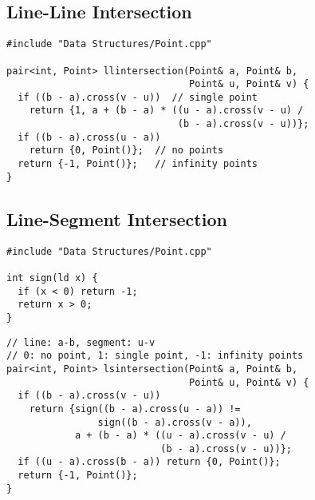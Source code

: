 \documentclass[twoside]{article}
\newcommand{\fileTitleStyle}{\large\underline}
\begin{document}
\begin{multicols*}{2}
\subsectionfont{\centering\bfseries\LARGE}
\subsectionfont{\fileTitleStyle}
\subsection*{Line-Line Intersection}
\begin{verbatim}
#include "Data Structures/Point.cpp"

pair<int, Point> llintersection(Point& a, Point& b,
                                Point& u, Point& v) {
  if ((b - a).cross(v - u))  // single point
    return {1, a + (b - a) * ((u - a).cross(v - u) /
                              (b - a).cross(v - u))};
  if ((b - a).cross(u - a))
    return {0, Point()};  // no points
  return {-1, Point()};   // infinity points
}
\end{verbatim}

\subsectionfont{\centering\bfseries\LARGE}
\subsectionfont{\fileTitleStyle}
\subsection*{Line-Segment Intersection}
\begin{verbatim}
#include "Data Structures/Point.cpp"

int sign(ld x) {
  if (x < 0) return -1;
  return x > 0;
}
\end{verbatim}
\vspace{-12pt}
\begin{verbatim}
// line: a-b, segment: u-v
// 0: no point, 1: single point, -1: infinity points
pair<int, Point> lsintersection(Point& a, Point& b,
                                Point& u, Point& v) {
  if ((b - a).cross(v - u))
    return {sign((b - a).cross(u - a)) !=
                sign((b - a).cross(v - a)),
            a + (b - a) * ((u - a).cross(v - u) /
                           (b - a).cross(v - u))};
  if ((u - a).cross(b - a)) return {0, Point()};
  return {-1, Point()};
}
\end{verbatim}

\subsectionfont{\centering\bfseries\LARGE}
\subsectionfont{\fileTitleStyle}

\end{multicols*}
\end{document}
